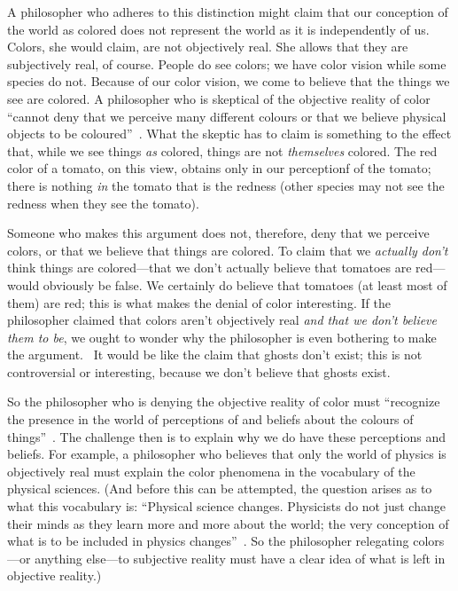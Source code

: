 \documentclass[11pt]{article}
\begin{document}
\begin{spacing}{1.5}
A philosopher who adheres to this distinction might claim that our
conception of the world as colored does not represent the world as it
is independently of us.  Colors, she would claim, are not objectively
real.  She allows that they are subjectively real, of course.  People
do see colors; we have color vision while some species do not.
Because of our color vision, we come to believe that the things we see
are colored.  A philosopher who is skeptical of the objective reality
of color ``cannot deny that we perceive many different colours or that
we believe physical objects to be coloured''~\citep[145]{stroud2000a}.
What the skeptic has to claim is something to the effect that, while
we see things {\em as} colored, things are not {\em themselves}
colored.  The red color of a tomato, on this view, obtains only in our
perceptionf of the tomato; there is nothing {\em in} the tomato that
is the redness (other species may not see the redness when they see
the tomato).
%

Someone who makes this argument does not, therefore, deny that we
perceive colors, or that we believe that things are colored.  To claim
that we {\em actually don't} think things are colored---that we don't
actually believe that tomatoes are red---would obviously be false.  We
certainly do believe that tomatoes (at least most of them) are red;
this is what makes the denial of color interesting.  If the
philosopher claimed that colors aren't objectively real {\em and that
  we don't believe them to be}, we ought to wonder why the philosopher
is even bothering to make the argument.
%
%
\ It would be like the claim that ghosts don't exist; this is not
controversial or interesting, because we don't believe that ghosts
exist.

So the philosopher who is denying the objective reality of color must
``recognize the presence in the world of perceptions of and beliefs
about the colours of things''~\citep[199]{stroud2000a}.  The challenge
then is to explain why we do have these perceptions and beliefs.  For
example, a philosopher who believes that only the world of physics is
objectively real must explain the color phenomena in the vocabulary of
the physical sciences.  (And before this can be attempted, the
question arises as to what this vocabulary is: ``Physical science
changes.  Physicists do not just change their minds as they learn more
and more about the world; the very conception of what is to be
included in physics changes''~\citep[53]{stroud2000a}.  So the
philosopher relegating colors---or anything else---to subjective
reality must have a clear idea of what is left in objective reality.)


\end{spacing}
\end{document}
